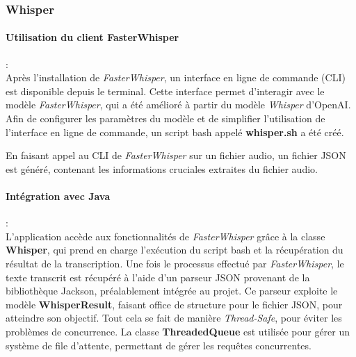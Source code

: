 \subsubsection{Whisper}
\label{sec:whisperImpl}

\paragraph*{Utilisation du client FasterWhisper} : \\ Après l'installation de
\textit{FasterWhisper}, un interface en ligne de commande (CLI) est disponible
depuis le terminal. Cette interface permet d'interagir avec le modèle
\textit{FasterWhisper}, qui a été amélioré à partir du modèle \textit{Whisper}
d'OpenAI. Afin de configurer les paramètres du modèle et de simplifier
l'utilisation de l'interface en ligne de commande, un script bash appelé
\textbf{whisper.sh} a été créé.

En faisant appel au CLI de \textit{FasterWhisper} sur un fichier audio, un
fichier JSON est généré, contenant les informations cruciales extraites du
fichier audio.

\paragraph*{Intégration avec Java}: \\ L'application accède aux fonctionnalités de
\textit{FasterWhisper} grâce à la classe \textbf{Whisper}, qui prend en
charge l'exécution du script bash et la récupération du résultat de la
transcription. Une fois le processus effectué par \textit{FasterWhisper}, le
texte transcrit est récupéré à l'aide d'un parseur JSON provenant de la
bibliothèque Jackson, préalablement intégrée au projet. Ce parseur exploite le
modèle \textbf{WhisperResult}, faisant office de structure pour le fichier
JSON, pour atteindre son objectif. Tout cela se fait de manière
\textit{Thread-Safe}, pour éviter les problèmes de concurrence. La classe
\textbf{ThreadedQueue} est utilisée pour gérer un système de file
d'attente, permettant de gérer les requêtes concurrentes.